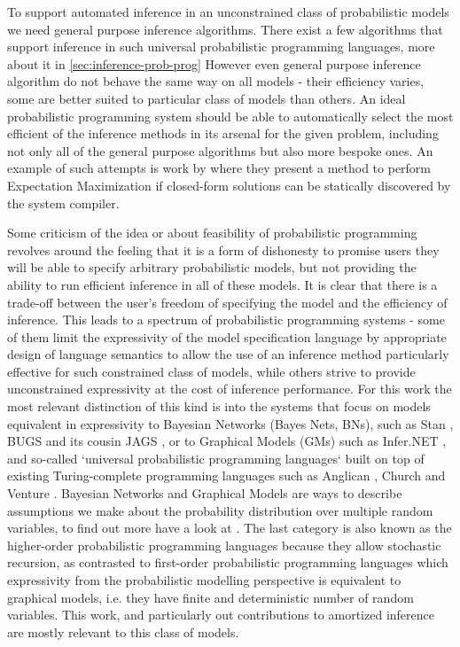\documentclass[12pt]{article}
\begin{document}
To support automated inference in an unconstrained class of probabilistic models we need general purpose inference algorithms.
There exist a few algorithms that support inference in such universal probabilistic programming languages, more about it in \autoref{sec:inference-prob-prog} 
However even general purpose inference algorithm do not behave the same way on all models - their efficiency varies, some are better suited to particular class of models than others.
An ideal probabilistic programming system should be able to automatically select the most efficient of the inference methods in its arsenal for the given problem, including not only all of the general purpose algorithms but also more bespoke ones.
An example of such attempts is work by \citet{ZinkovEM} where they present a method to perform Expectation Maximization \citep{EM} if closed-form solutions can be statically discovered by the system compiler.

Some criticism of the idea or about feasibility of probabilistic programming revolves around the feeling that it is a form of dishonesty to promise users they will be able to specify arbitrary probabilistic models, but not providing the ability to run efficient inference in all of these models.
It is clear that there is a trade-off between the user's freedom of specifying the model and the efficiency of inference.
This leads to a spectrum of probabilistic programming systems - some of them limit the expressivity of the model specification language by appropriate design of language semantics to allow the use of an inference method particularly effective for such constrained class of models, while others strive to provide unconstrained expressivity at the cost of inference performance.
For this work the most relevant distinction of this kind is into the systems that focus on models equivalent in expressivity to Bayesian Networks (Bayes Nets, BNs), such as Stan \citep{Stan}, BUGS \citep{WinBUGS,BUGSproject} and its cousin JAGS \citep{JAGS}, or to Graphical Models (GMs) such as Infer.NET \citep{InferNET}, and so-called `universal probabilistic programming languages` built on top of existing Turing-complete programming languages such as Anglican \citep{anglican}, Church \citep{GoodmanEtAl2008} and Venture \citep{venture}.
Bayesian Networks and Graphical Models are ways to describe assumptions we make about the probability distribution over multiple random variables, to find out more have a look at \citep{KollerFriedman2009}.
The last category is also known as the higher-order probabilistic programming languages because they allow stochastic recursion, as contrasted to first-order probabilistic programming languages which expressivity from the probabilistic modelling perspective is equivalent to graphical models, i.e. they have finite and deterministic number of random variables.
This work, and particularly out contributions to amortized inference are mostly relevant to this class of models.
\end{document}
